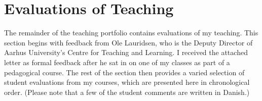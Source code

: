 \documentclass[11pt]{article}
\begin{document}
\section{ Evaluations of Teaching}

The remainder of the teaching portfolio contains evaluations of my teaching. This section begins with feedback from Ole Lauridsen, who is the Deputy Director of Aarhus University’s Centre for Teaching and Learning. I received the attached letter as formal feedback after he sat in on one of my classes as part of a pedagogical course. The rest of the section then provides a varied selection of student evaluations from my courses, which are presented here in chronological order. (Please note that a few of the student comments are written in Danish.)




\end{document}
